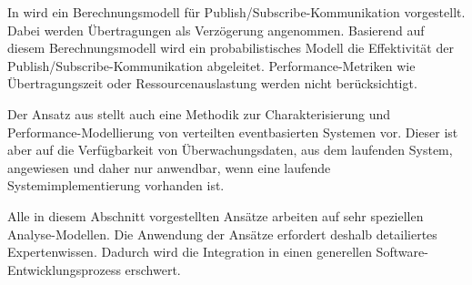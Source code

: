 In \cite{baldoni} wird ein Berechnungsmodell für Publish/Subscribe-Kommunikation vorgestellt. Dabei werden Übertragungen als Verzögerung angenommen. Basierend auf diesem Berechnungsmodell wird ein probabilistisches Modell die Effektivität der Publish/Subscribe-Kommunikation abgeleitet. Performance-Metriken wie Übertragungszeit oder Ressourcenauslastung werden nicht berücksichtigt. \par
Der Ansatz aus \cite{Kounev2008} stellt auch eine Methodik zur Charakterisierung und Performance-Modellierung von verteilten eventbasierten Systemen vor. Dieser ist aber auf die Verfügbarkeit von Überwachungsdaten, aus dem laufenden System, angewiesen und daher nur anwendbar, wenn eine laufende Systemimplementierung vorhanden ist. \par
Alle in diesem Abschnitt vorgestellten Ansätze arbeiten auf sehr speziellen Analyse-Modellen. Die Anwendung der Ansätze erfordert deshalb detailiertes Expertenwissen. Dadurch wird die Integration in einen generellen Software-Entwicklungsprozess erschwert.  

